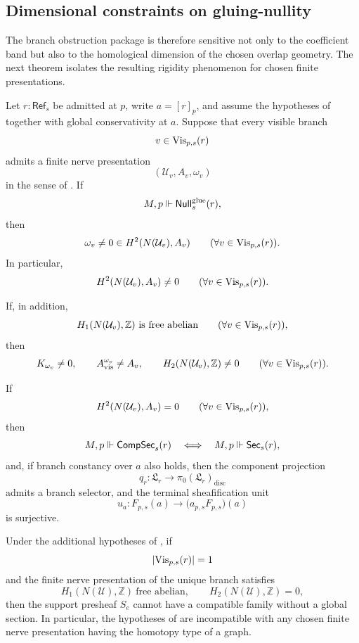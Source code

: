\subsection{Dimensional constraints on gluing-nullity}

The branch obstruction package is therefore sensitive not only to the coefficient band but also to the homological dimension of the chosen overlap geometry. The next theorem isolates the resulting rigidity phenomenon for chosen finite presentations.

\begin{theorem}\label{thm:two-dimensionality-gluing-null}
Let $r:\mathsf{Ref}_s$ be admitted at $p$, write $a=[r]_p$, and assume the hypotheses of  together with global conservativity at $a$. Suppose that every visible branch
\[
v\in \mathrm{Vis}_{p,s}(r)
\]
admits a finite nerve presentation
\[
(\mathcal U_v,A_v,\omega_v)
\]
in the sense of . If
\[
M,p\Vdash \mathsf{Null}^{\mathrm{glue}}_s(r),
\]
then
\[
\omega_v\neq 0\in H^2(N(\mathcal U_v),A_v)
\qquad
(\forall v\in \mathrm{Vis}_{p,s}(r)).
\]
In particular,
\[
H^2(N(\mathcal U_v),A_v)\neq 0
\qquad
(\forall v\in \mathrm{Vis}_{p,s}(r)).
\]

If, in addition,
\[
H_1(N(\mathcal U_v),\mathbb Z)\ \text{is free abelian}
\qquad
(\forall v\in \mathrm{Vis}_{p,s}(r)),
\]
then
\[
K_{\omega_v}\neq 0,
\qquad
A_{\mathrm{vis}}^{\omega_v}\neq A_v,
\qquad
H_2(N(\mathcal U_v),\mathbb Z)\neq 0
\qquad
(\forall v\in \mathrm{Vis}_{p,s}(r)).
\]

If
\[
H^2(N(\mathcal U_v),A_v)=0
\qquad
(\forall v\in \mathrm{Vis}_{p,s}(r)),
\]
then
\[
M,p\Vdash \mathsf{CompSec}_s(r)
\quad\Longleftrightarrow\quad
M,p\Vdash \mathsf{Sec}_s(r),
\]
and, if branch constancy over $a$ also holds, then the component projection
\[
q_r:\mathfrak L_r\to \pi_0(\mathfrak L_r)_{\mathrm{disc}}
\]
admits a branch selector, and the terminal sheafification unit
\[
u_a:F_{p,s}(a)\to \bigl(a_{p,s}F_{p,s}\bigr)(a)
\]
is surjective.

Under the additional hypotheses of , if
\[
|\mathrm{Vis}_{p,s}(r)|=1
\]
and the finite nerve presentation of the unique branch satisfies
\[
H_1(N(\mathcal U),\mathbb Z)\ \text{free abelian},
\qquad
H_2(N(\mathcal U),\mathbb Z)=0,
\]
then the support presheaf $S_e$ cannot have a compatible family without a global section. In particular, the hypotheses of  are incompatible with any chosen finite nerve presentation having the homotopy type of a graph.
\end{theorem}

